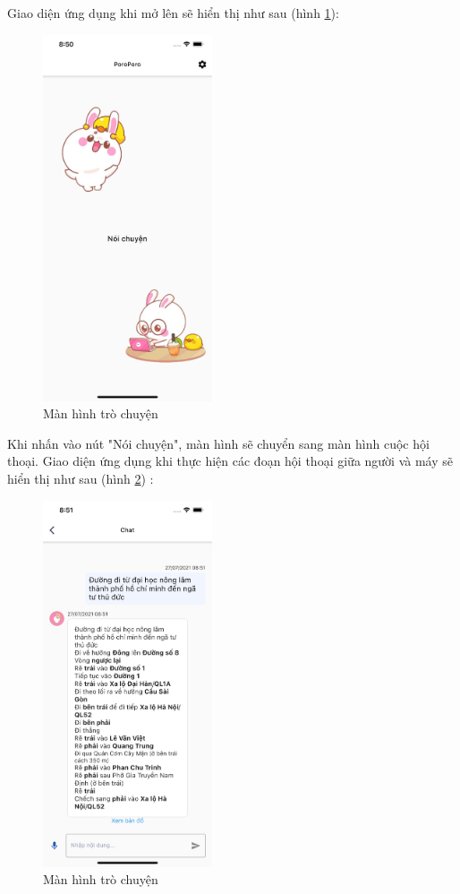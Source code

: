 Giao diện ứng dụng khi mở lên sẽ hiển thị như sau (hình \ref{fig:home}):
\begin{figure}[H]
    \centering
    \includegraphics[width=5cm]{images/home.jpg}
    \caption{Màn hình trò chuyện}
    \label{fig:home}
\end{figure}
Khi nhấn vào nút "Nói chuyện", màn hình sẽ chuyển sang màn hình cuộc hội thoại.
Giao diện ứng dụng khi thực hiện các đoạn hội thoại giữa người và máy sẽ hiển thị như sau (hình \ref{fig:screen-chat}) :
\begin{figure}[H]
    \centering
    \includegraphics[width=5cm]{images/Screen-chat.jpg}
    \caption{Màn hình trò chuyện}
    \label{fig:screen-chat}
\end{figure}

